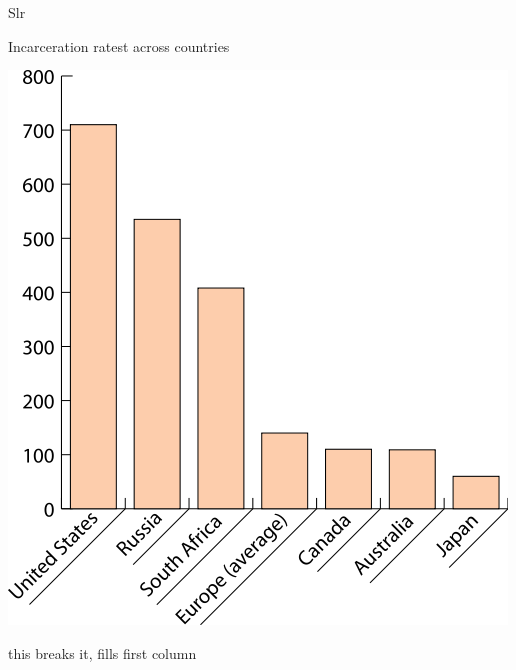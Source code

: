 \begin{chart}{S}{lr}
\caption{Incarceration ratest across countries}
\label{chart:incarceration}
\includegraphics[width=\chartwidth,height=\chartheight]{incarceration}  
\end{chart}

\lipsum[1-4]
\lipsum[1-5] this breaks it, fills first column


